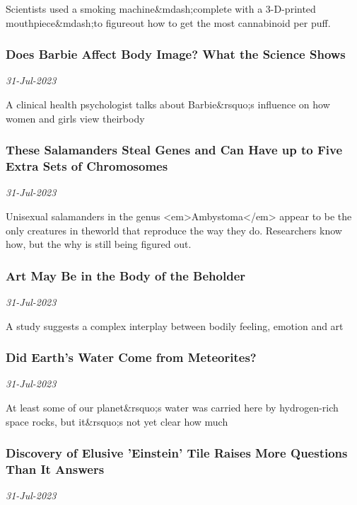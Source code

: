 Scientists used a smoking machine\&mdash;complete with a 3-D-printed mouthpiece\&mdash;to figureout how to get the most cannabinoid per puff.
\subsubsection{Does Barbie Affect Body Image? What the Science Shows \href{https://www.scientificamerican.com/article/does-barbie-affect-body-image-what-the-science-shows/}{}}
\textit{31-Jul-2023}

A clinical health psychologist talks about Barbie\&rsquo;s influence on how women and girls view theirbody
\subsubsection{These Salamanders Steal Genes and Can Have up to Five Extra Sets of Chromosomes \href{https://www.scientificamerican.com/video/these-salamanders-steal-genes-and-can-have-up-to-five-extra-sets-of-chromosomes/}{}}
\textit{31-Jul-2023}

Unisexual salamanders in the genus <em>Ambystoma</em> appear to be the only creatures in theworld that reproduce the way they do. Researchers know how, but the why is still being figured out.
\subsubsection{Art May Be in the Body of the Beholder \href{https://www.scientificamerican.com/article/art-may-be-in-the-body-of-the-beholder/}{}}
\textit{31-Jul-2023}

A study suggests a complex interplay between bodily feeling, emotion and art
\subsubsection{Did Earth's Water Come from Meteorites? \href{https://www.scientificamerican.com/article/did-earths-water-come-from-meteorites/}{}}
\textit{31-Jul-2023}

At least some of our planet\&rsquo;s water was carried here by hydrogen-rich space rocks, but it\&rsquo;s not yet clear how much
\subsubsection{Discovery of Elusive 'Einstein' Tile Raises More Questions Than It Answers \href{https://www.scientificamerican.com/article/discovery-of-elusive-einstein-tile-raises-more-questions-than-it-answers/}{}}
\textit{31-Jul-2023}

